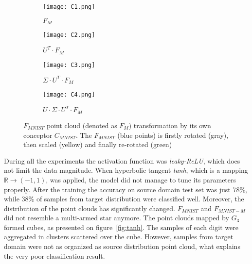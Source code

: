 \documentclass{article}
\begin{document}
\begin{figure}[H]%
    \centering
    \begin{subfigure}[b]{0.24\textwidth}
        \texttt{[image: C1.png]}
        \caption{$F_{M}$}
    \end{subfigure}%
    \begin{subfigure}[b]{0.24\textwidth}
        \texttt{[image: C2.png]}
        \caption{$U^{T} \cdot F_{M}$}
    \end{subfigure}%
    \begin{subfigure}[b]{0.24\textwidth}
        \texttt{[image: C3.png]}
        \caption{$\Sigma \cdot U^{T} \cdot F_{M}$}
    \end{subfigure}%
    \begin{subfigure}[b]{0.24\textwidth}
        \texttt{[image: C4.png]}
        \caption{$U \cdot \Sigma \cdot U^{T} \cdot F_{M}$}
    \end{subfigure}%
    
    \caption{$F_{MNIST}$ point cloud (denoted as $F_{M}$) transformation by its own conceptor $C_{MNIST}$. The  $F_{MNIST}$ (blue points) is firstly rotated (gray), then scaled (yellow) and finally re-rotated (green)}%
    \label{fig:ConceptorRotation}%
\end{figure}
\par
During all the experiments the activation function was \textit{leaky-ReLU}, which does not limit the data magnitude. When hyperbolic tangent \textit{tanh}, which is a mapping $\mathbb{R} \rightarrow (-1, 1)$, was applied, the model did not manage to tune its parameters properly. After the training the accuracy on source domain test set was just 78\%, while 38\% of samples from target distribution were classified well. Moreover, the distribution of the point clouds has significantly changed. $F_{MNIST}$ and $F_{MNIST-M}$ did not resemble a multi-armed star anymore. The point clouds mapped by $G_{3}$ formed  cubes, as presented on figure~\ref{fig:tanh}. The samples of each digit were aggregated in clusters scattered over the cube. However, samples from target domain were not as organized as source distribution point cloud, what explains the very poor classification result.
\noindent%
\end{document}
